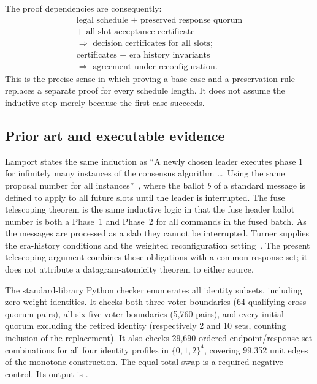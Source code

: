 The proof dependencies are consequently:
\[
\begin{gathered}
\text{legal schedule + preserved response quorum}\\
{}+\text{ all-slot acceptance certificate}\\
\Longrightarrow\text{ decision certificates for all slots};\\
\text{certificates + era history invariants}\\
\Longrightarrow\text{ agreement under reconfiguration}.
\end{gathered}
\]
This is the precise sense in which proving a base case and a preservation rule
replaces a separate proof for every schedule length. It does not assume the
inductive step merely because the first case succeeds.

\subsection{Prior art and executable evidence}
Lamport states the same induction as ``A newly chosen leader executes phase 1 for
infinitely many instances of the consensus algorithm \ldots\ Using the same
proposal number for all instances''~\cite{fuse-paxos}, where the ballot $b$ of a
standard message is defined to apply to all future slots until the leader is
interrupted. The fuse telescoping theorem is the same inductive logic in that the
fuse header ballot number is both a Phase~1 and Phase~2 for all commands in the
fused batch. As the messages are processed as a slab they cannot be interrupted.
Turner supplies the era-history conditions and the weighted reconfiguration
setting~\cite{turner}. The present
telescoping argument combines those obligations with a common response set;
it does not attribute a datagram-atomicity theorem to either source.

The standard-library Python checker
 enumerates all identity
subsets, including zero-weight identities. It checks both three-voter
boundaries (64 qualifying cross-quorum pairs), all six five-voter boundaries
(5,760 pairs), and every initial quorum excluding the retired identity
(respectively 2 and 10 sets, counting inclusion of the replacement).
It also checks 29,690 ordered endpoint/response-set combinations for all four
identity profiles in $\{0,1,2\}^4$, covering 99,352 unit edges of the monotone
construction. The equal-total swap is a required negative control. Its output
is .

